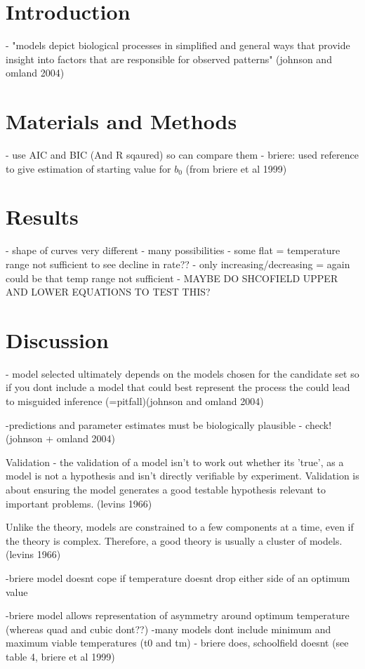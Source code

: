\documentclass[12pt]{article}
\begin{document}
\section{Introduction}
	- "models depict biological processes in simplified and general ways that provide insight into factors that are responsible for observed patterns" (johnson and omland 2004)
\section{Materials and Methods}
	- use AIC and BIC (And R sqaured) so can compare them
	- briere: used reference to give estimation of starting value for $b_0$ (from briere et al 1999)

\section{Results}
- shape of curves very different - many possibilities
- some flat = temperature range not sufficient to see decline in rate??
- only increasing/decreasing = again could be that temp range not sufficient - MAYBE DO SHCOFIELD UPPER AND LOWER EQUATIONS TO TEST THIS?

\section{Discussion}

- model selected ultimately depends on the models chosen for the candidate set so if you dont include a model that could best represent the process the could lead to misguided inference (=pitfall)(johnson and omland 2004)

-predictions and parameter estimates must be biologically plausible - check! (johnson + omland 2004)

Validation - the validation of a model isn't to work out whether its 'true', as a model is not a hypothesis and isn't directly verifiable by experiment. Validation is about ensuring the model generates a good testable hypothesis relevant to important problems. (levins 1966)

Unlike the theory, models are constrained to a few components at a time, even if the theory is complex. Therefore, a good theory is usually a cluster of models. (levins 1966)

-briere model doesnt cope if temperature doesnt drop either side of an optimum value

-briere model allows representation of asymmetry around optimum temperature (whereas quad and cubic dont??)
-many models dont include minimum and maximum viable temperatures (t0 and tm) - briere does, schoolfield doesnt (see table 4, briere et al 1999)
\end{document}
